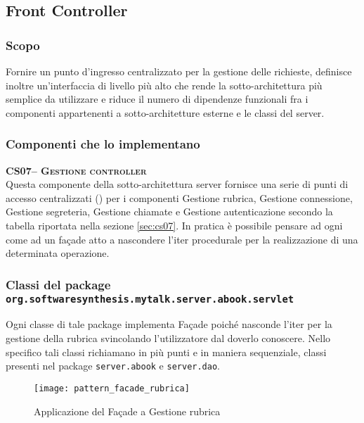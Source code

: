 \subsection{Front Controller}\label{sec:patternfacade}

\subsubsection{Scopo}
Fornire un punto d'ingresso centralizzato per la gestione delle richieste, definisce inoltre un'interfaccia di livello più alto che rende la sotto-architettura più semplice da utilizzare e riduce il numero di dipendenze funzionali fra i componenti appartenenti a sotto-architetture esterne e le classi del server.

\subsubsection{Componenti che lo implementano}
\begin{description}
  \item{\scshape\bfseries CS07-- Gestione controller}\\
Questa componente della sotto-architettura server fornisce una serie di punti di accesso centralizzati () per i componenti \textsf{Gestione rubrica}, \textsf{Gestione connessione}, \textsf{Gestione segreteria}, \textsf{Gestione chiamate} e \textsf{Gestione autenticazione} secondo la tabella riportata nella sezione \vref{sec:cs07}. In pratica è possibile pensare ad ogni  come ad un façade atto a nascondere l'iter procedurale per la realizzazione di una determinata operazione.
\end{description}

\subsubsection*{Classi del package \texttt{org.softwaresynthesis.mytalk.server.abook.servlet}}

Ogni classe di tale package implementa Façade poiché nasconde l'iter per la gestione della rubrica svincolando l'utilizzatore dal doverlo conoscere. Nello specifico tali classi richiamano in più punti e in maniera sequenziale, classi presenti nel package \texttt{server.abook} e \texttt{server.dao}.

\begin{figure}[H]
  \centering
   \texttt{[image: pattern\_facade\_rubrica]}
  \caption{Applicazione del  Façade a \textsf{Gestione rubrica}}\label{fig:facadeaddressbook1}
\end{figure}

